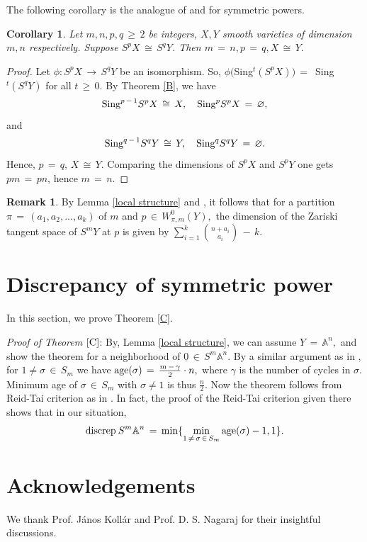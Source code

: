 \documentclass[12pt,reqno]{amsart}
\newtheorem{corollary}[lemma]{Corollary}
\theoremstyle{definition}
\newtheorem{remark}[lemma]{Remark}
\numberwithin{equation}{section}
\begin{document}
The following corollary is the analogue of {\cite[Theorem 1.4]{Ha}} and {\cite[Theorem 1.4]{sosna2013fourier}} for symmetric powers.
 \begin{corollary}
     Let $m,n,p,q\,\geq\, 2$ be integers, $X,Y$ smooth varieties of dimension $m,n$ respectively. Suppose $S^pX\,\cong\, S^q Y$. Then $m\,=\,n, p\,=\,q, X\,\cong\, Y.$
 \end{corollary}
 \begin{proof}
     Let $\phi: S^pX\,\to\, S^q Y$ be an isomorphism. So, $\phi($Sing$^t (S^pX))\,=\,$ Sing$^t(S^qY)$ for all $t\,\geq\, 0.$ By Theorem \ref{B}, we have
     $$\textnormal{Sing}^{p\,-\,1} S^pX \,\cong\, X, \quad \textnormal{Sing}^p S^pX\,=\, \varnothing,$$ and $$\textnormal{Sing}^{q\,-\,1} S^qY \,\cong\, Y, \quad \textnormal{Sing}^q S^qY\,=\, \varnothing.$$ Hence, $p\,=\,q,\, X\,\cong\, Y.$ Comparing the dimensions of $S^pX$ and $S^pY$ one gets $pm\,=\,pn$, hence $m\,=\,n.$
 \end{proof}
 
\begin{remark}\label{tangent space}
    By Lemma \ref{local structure} and {\cite[Proof of Theorem 3.1.1]{Sh}}, it follows that for a partition $\pi\,=\,(a_1, a_2,...,a_k)$ of $m$ and $p\,\in\, W_{\pi, m}^0(Y),$ the dimension of the Zariski tangent space of $S^mY$ at $p$ is given by $\sum_{i=1}^k {{n+a_i}\choose {a_i}}\,-\,k.$
\end{remark}
\section{Discrepancy of symmetric power}

      In this section, we prove Theorem \ref{C}.
      
\textit{Proof of Theorem $\ref{C}$}:
 By, Lemma \ref{local structure}, we can assume $ Y \,=\,\mathbb{A}^n,$ and show the theorem for a neighborhood of $ \underline{0}\, \in\, S^{m} \mathbb{A}^n.$ By a similar argument as in {\cite[\S\, 3]{KX}}, for $ 1 \neq \sigma\, \in\, S_{m}$ we have $\textnormal{age}(\sigma)\, =\,\frac{m\,-\,\gamma}{2}\cdot n,$ where  $\gamma$ is the number of cycles in $ \sigma$. Minimum age  of $ \sigma \,\in\, S_{m}$ with  $ \sigma \neq 1$ is thus $ \frac{n}{2}.$ Now the theorem follows from Reid-Tai criterion as in \cite{IR}. In fact, the proof of the Reid-Tai criterion given there shows that in our situation,
$$ \textnormal{discrep}  \medspace S^m \mathbb{A}^n\,=\,\min\{\min_{1\, \neq\, \sigma\, \in\, S_m} \textnormal{age} (\sigma)-1, 1\} .$$
\section{Acknowledgements}\vskip 5mm We thank Prof. János Kollár and Prof. D. S. Nagaraj for their insightful discussions.
\printbibliography
 
\end{document}
